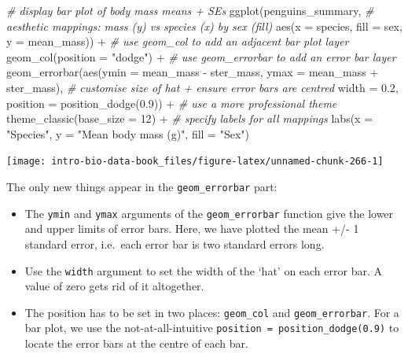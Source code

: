 \documentclass[
]{book}
\newenvironment{Shaded}{\begin{snugshade}}{\end{snugshade}}
\newcommand{\AttributeTok}[1]{\textcolor[rgb]{0.77,0.63,0.00}{#1}}
\newcommand{\CommentTok}[1]{\textcolor[rgb]{0.56,0.35,0.01}{\textit{#1}}}
\newcommand{\DecValTok}[1]{\textcolor[rgb]{0.00,0.00,0.81}{#1}}
\newcommand{\FloatTok}[1]{\textcolor[rgb]{0.00,0.00,0.81}{#1}}
\newcommand{\FunctionTok}[1]{\textcolor[rgb]{0.00,0.00,0.00}{#1}}
\newcommand{\NormalTok}[1]{#1}
\newcommand{\SpecialCharTok}[1]{\textcolor[rgb]{0.00,0.00,0.00}{#1}}
\newcommand{\StringTok}[1]{\textcolor[rgb]{0.31,0.60,0.02}{#1}}
\providecommand{\tightlist}{%
  \setlength{\itemsep}{0pt}\setlength{\parskip}{0pt}}
\begin{document}
\begin{Shaded}
\begin{Highlighting}[]
\CommentTok{\# display bar plot of body mass means + SE\textquotesingle{}s}
\FunctionTok{ggplot}\NormalTok{(penguins\_summary, }
       \CommentTok{\# aesthetic mappings: mass (y) vs species (x) by sex (fill)}
       \FunctionTok{aes}\NormalTok{(}\AttributeTok{x =}\NormalTok{ species, }\AttributeTok{fill =}\NormalTok{ sex, }\AttributeTok{y =}\NormalTok{ mean\_mass)) }\SpecialCharTok{+} 
  \CommentTok{\# use geom\_col to add an adjacent bar plot layer}
  \FunctionTok{geom\_col}\NormalTok{(}\AttributeTok{position =} \StringTok{"dodge"}\NormalTok{) }\SpecialCharTok{+} 
  \CommentTok{\# use geom\_errorbar to add an error bar layer}
  \FunctionTok{geom\_errorbar}\NormalTok{(}\FunctionTok{aes}\NormalTok{(}\AttributeTok{ymin =}\NormalTok{ mean\_mass }\SpecialCharTok{{-}}\NormalTok{ ster\_mass, }\AttributeTok{ymax =}\NormalTok{ mean\_mass }\SpecialCharTok{+}\NormalTok{ ster\_mass),}
                \CommentTok{\# customise size of hat + ensure error bars are centred}
                \AttributeTok{width =} \FloatTok{0.2}\NormalTok{, }\AttributeTok{position =} \FunctionTok{position\_dodge}\NormalTok{(}\FloatTok{0.9}\NormalTok{)) }\SpecialCharTok{+} 
  \CommentTok{\# use a more professional theme }
  \FunctionTok{theme\_classic}\NormalTok{(}\AttributeTok{base\_size =} \DecValTok{12}\NormalTok{) }\SpecialCharTok{+} 
  \CommentTok{\# specify labels for all mappings}
  \FunctionTok{labs}\NormalTok{(}\AttributeTok{x =} \StringTok{"Species"}\NormalTok{, }\AttributeTok{y =} \StringTok{"Mean body mass (g)"}\NormalTok{, }\AttributeTok{fill =} \StringTok{"Sex"}\NormalTok{)}
\end{Highlighting}
\end{Shaded}

\begin{center}\texttt{[image: intro-bio-data-book\_files/figure-latex/unnamed-chunk-266-1]} \end{center}

The only new things appear in the \texttt{geom\_errorbar} part:

\begin{itemize}
\tightlist
\item
  The \texttt{ymin} and \texttt{ymax} arguments of the \texttt{geom\_errorbar} function give the lower and upper limits of error bars. Here, we have plotted the mean +/- 1 standard error, i.e.~each error bar is two standard errors long.
\item
  Use the \texttt{width} argument to set the width of the `hat' on each error bar. A value of zero gets rid of it altogether.
\item
  The position has to be set in two places: \texttt{geom\_col} and \texttt{geom\_errorbar}. For a bar plot, we use the not-at-all-intuitive \texttt{position\ =\ position\_dodge(0.9)} to locate the error bars at the centre of each bar.
\end{itemize}
\end{document}
